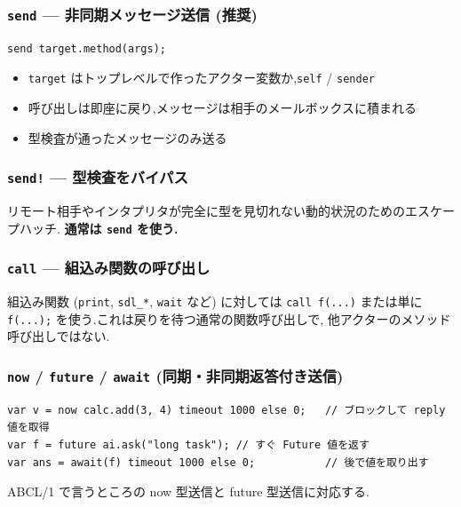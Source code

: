 \documentclass[11pt,a4paper]{article}
\begin{document}
\subsubsection*{\texttt{send} --- 非同期メッセージ送信 (推奨)}

\begin{lstlisting}
send target.method(args);
\end{lstlisting}

\begin{itemize}
  \item \texttt{target} はトップレベルで作ったアクター変数か,\texttt{self} / \texttt{sender}
  \item 呼び出しは即座に戻り,メッセージは相手のメールボックスに積まれる
  \item 型検査が通ったメッセージのみ送る
\end{itemize}

\subsubsection*{\texttt{send!} --- 型検査をバイパス}

リモート相手やインタプリタが完全に型を見切れない動的状況のためのエスケープハッチ.
\textbf{通常は \texttt{send} を使う.}

\subsubsection*{\texttt{call} --- 組込み関数の呼び出し}

組込み関数 (\texttt{print}, \texttt{sdl\_*}, \texttt{wait} など) に対しては
\texttt{call f(...)} または単に \texttt{f(...);} を使う.これは戻りを待つ通常の関数呼び出しで,
他アクターのメソッド呼び出しではない.

\subsubsection*{\texttt{now} / \texttt{future} / \texttt{await} (同期・非同期返答付き送信)}

\begin{lstlisting}
var v = now calc.add(3, 4) timeout 1000 else 0;   // ブロックして reply 値を取得
var f = future ai.ask("long task"); // すぐ Future 値を返す
var ans = await(f) timeout 1000 else 0;           // 後で値を取り出す
\end{lstlisting}

ABCL/1 で言うところの now 型送信と future 型送信に対応する.
\end{document}
